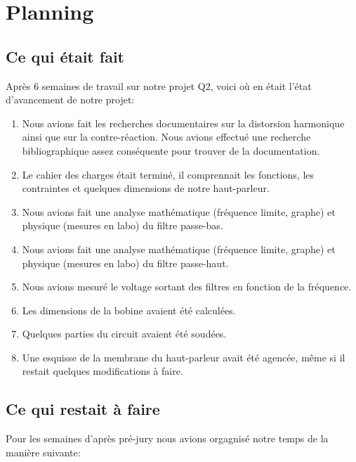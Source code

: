 

\section{Planning}


\subsection{Ce qui était fait}
Après 6 semaines de travail sur notre projet Q2, voici où en était l'état d'avancement de notre projet:


\begin{enumerate}
	\item Nous avions fait les recherches documentaires sur la distorsion harmonique ainsi que sur la contre-réaction.
	Nous avions effectué une recherche bibliographique assez conséquente pour trouver de la documentation.
	\item Le cahier des charges était terminé, il comprennait les fonctions, les contraintes et quelques dimensions de notre haut-parleur.
	\item Nous avions fait une analyse mathématique (fréquence limite, graphe) et physique (mesures en labo) du filtre passe-bas. 
	\item Nous avions fait une analyse mathématique (fréquence limite, graphe) et physique (mesures en labo) du filtre passe-haut.
	\item Nous avions mesuré le voltage sortant des filtres en fonction de la fréquence.
	\item Les dimensions de la bobine avaient été calculées.
	\item Quelques parties du circuit avaient été soudées.
	\item Une esquisse de la membrane du haut-parleur avait été agencée, même si il restait quelques modifications à faire.
\end{enumerate}

\subsection{Ce qui restait à faire}

Pour les semaines d'après pré-jury nous avions orgagnisé notre temps de la manière suivante:

